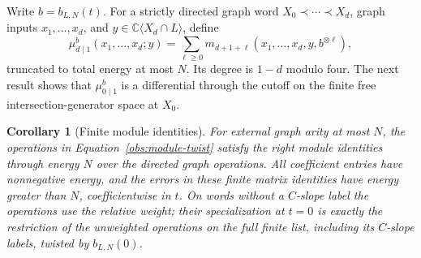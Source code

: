 \documentclass[11pt]{article}
\newtheorem{corollary}[theorem]{Corollary}
\theoremstyle{definition}
\theoremstyle{remark}
\numberwithin{equation}{section}
\begin{document}
Write $b=b_{L,N}(t)$.  For a strictly directed graph word
$X_0\prec\cdots\prec X_d$, graph inputs $x_1,\ldots,x_d$,
and $y\in\mathbb C\langle X_d\cap L\rangle$, define
\begin{equation}
 \label{obs:module-twist}
 \mu^{b}_{d\mid1}(x_1,\ldots,x_d;y)
 =\sum_{\ell\ge0}m_{d+1+\ell}
       (x_1,\ldots,x_d,y,b^{\otimes\ell}),
\end{equation}
truncated to total energy at most $N$.  Its degree is $1-d$
modulo four.  The next result shows that $\mu^b_{0\mid1}$
is a differential through the cutoff on the finite free
intersection-generator space at $X_0$.

\begin{corollary}[Finite module identities]
\label{obs:finite-module}
For external graph arity at most $N$, the operations in
Equation~\eqref{obs:module-twist} satisfy the right module
identities through energy $N$ over the directed graph
operations.  All coefficient entries have nonnegative
energy, and the errors in these finite matrix identities
have energy greater than $N$, coefficientwise in $t$.
On words without a $C$-slope label the operations use the
relative weight; their specialization at $t=0$ is exactly
the restriction of the unweighted operations on the full
finite list, including its $C$-slope labels, twisted by
$b_{L,N}(0)$.
\end{corollary}
\end{document}
